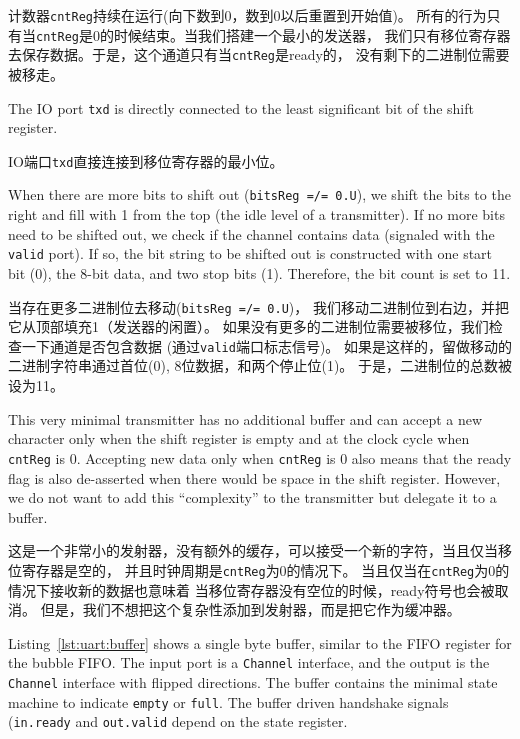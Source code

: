 \documentclass[%
    10pt,
    headinclude, footexclude,
    openright, %
    notitlepage,
    cleardoubleempty,
    headsepline,
    pointlessnumbers,
    bibtotoc, idxtotoc,
    ]{scrbook}
\newcommand{\code}[1]{{\small{\texttt{#1}}}}
\begin{document}
计数器\code{cntReg}持续在运行(向下数到0，数到0以后重置到开始值)。
所有的行为只有当\code{cntReg}是0的时候结束。当我们搭建一个最小的发送器，
我们只有移位寄存器去保存数据。于是，这个通道只有当\code{cntReg}是ready的，
没有剩下的二进制位需要被移走。

The IO port \code{txd} is directly connected to the least significant bit
of the shift register.

IO端口\code{txd}直接连接到移位寄存器的最小位。

When there are more bits to shift out (\code{bitsReg =/= 0.U}),
we shift the bits to the right and fill with 1 from the top (the idle level
of a transmitter).
If no more bits need to be shifted out, we check if the channel contains
data (signaled with the \code{valid} port). If so, the bit string to
be shifted out is constructed with one start bit (0), the 8-bit data, and
two stop bits (1). Therefore, the bit count is set to 11.

当存在更多二进制位去移动(\code{bitsReg =/= 0.U})，
我们移动二进制位到右边，并把它从顶部填充1（发送器的闲置）。
如果没有更多的二进制位需要被移位，我们检查一下通道是否包含数据
(通过\code{valid}端口标志信号)。
如果是这样的，留做移动的二进制字符串通过首位(0), 8位数据，和两个停止位(1)。
于是，二进制位的总数被设为11。

This very minimal transmitter has no additional buffer and can
accept a new character only when the shift register is empty
and at the clock cycle when \code{cntReg} is 0.
Accepting new data only when \code{cntReg} is 0 also means
that the ready flag is also de-asserted when there would be
space in the shift register. However, we do not want to add this
``complexity'' to the transmitter but delegate it to a buffer.

这是一个非常小的发射器，没有额外的缓存，可以接受一个新的字符，当且仅当移位寄存器是空的，
并且时钟周期是\code{cntReg}为0的情况下。
当且仅当在\code{cntReg}为0的情况下接收新的数据也意味着
当移位寄存器没有空位的时候，ready符号也会被取消。
但是，我们不想把这个复杂性添加到发射器，而是把它作为缓冲器。

Listing~\ref{lst:uart:buffer} shows a single byte buffer, similar to
the FIFO register for the bubble FIFO. The input port is a \code{Channel}
interface, and the output is the \code{Channel} interface with
flipped directions. The buffer contains the minimal state machine
to indicate \code{empty} or \code{full}. The buffer driven handshake
signals (\code{in.ready} and \code{out.valid} depend on the state
register.
\end{document}
